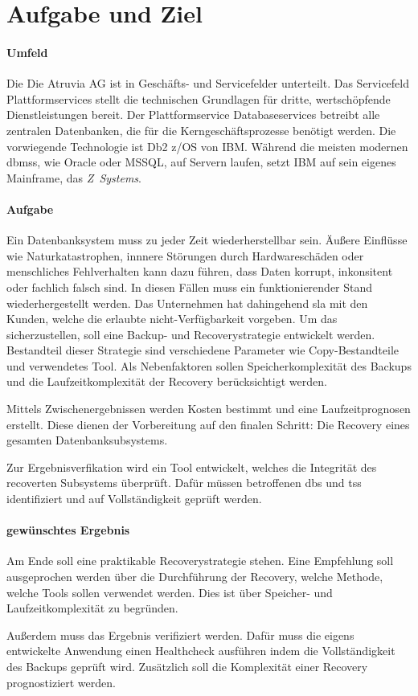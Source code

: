 \chapter{Aufgabe und Ziel}

\subsubsection{Umfeld}
Die \FirmenName
Die Atruvia AG ist in Geschäfts- und Servicefelder unterteilt. Das Servicefeld Plattformservices stellt die technischen Grundlagen für dritte, wertschöpfende Dienstleistungen bereit. Der Plattformservice Databaseservices betreibt alle zentralen Datenbanken, die für die Kerngeschäftsprozesse benötigt werden. Die vorwiegende Technologie ist Db2 z/OS von IBM. Während die meisten modernen \acp{dbms}, wie Oracle oder MSSQL, auf Servern laufen, setzt IBM auf sein eigenes Mainframe, das \emph{\mbox{Z Systems}}. 

\subsubsection{Aufgabe}
Ein Datenbanksystem muss zu jeder Zeit wiederherstellbar sein. Äußere Einflüsse wie Naturkatastrophen, innnere Störungen durch Hardwareschäden oder menschliches Fehlverhalten kann dazu führen, dass Daten korrupt, inkonsitent oder fachlich falsch sind. In diesen Fällen muss ein funktionierender Stand wiederhergestellt werden. Das Unternehmen hat dahingehend \ac{sla} mit den Kunden, welche die erlaubte nicht-Verfügbarkeit vorgeben. Um das sicherzustellen, soll eine Backup- und Recoverystrategie entwickelt werden. Bestandteil dieser Strategie sind verschiedene Parameter wie Copy-Bestandteile und verwendetes Tool. Als Nebenfaktoren sollen Speicherkomplexität des Backups und die Laufzeitkomplexität der Recovery berücksichtigt werden.

Mittels Zwischenergebnissen werden Kosten bestimmt und eine Laufzeitprognosen erstellt. Diese dienen der Vorbereitung auf den finalen Schritt: Die Recovery eines gesamten Datenbanksubsystems.

Zur Ergebnisverfikation wird ein Tool entwickelt, welches die Integrität des recoverten Subsystems überprüft. Dafür müssen betroffenen \acp{db} und \acp{ts} identifiziert und auf Vollständigkeit geprüft werden.



\subsubsection{gewünschtes Ergebnis}
Am Ende soll eine praktikable Recoverystrategie stehen. Eine Empfehlung soll ausgeprochen werden über die Durchführung der Recovery, welche Methode, welche Tools sollen verwendet werden. Dies ist über Speicher- und Laufzeitkomplexität zu begründen.

Außerdem muss das Ergebnis verifiziert werden. Dafür muss die eigens entwickelte Anwendung einen Healthcheck ausführen indem die Vollständigkeit des Backups geprüft wird. Zusätzlich soll die Komplexität einer Recovery prognostiziert werden.